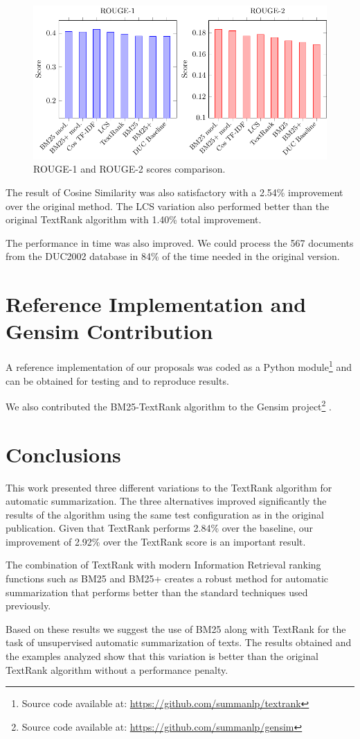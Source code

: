 \documentclass{llncs}
\begin{document}
\begin{figure}[h!]
    \centering
    \includegraphics[width=1\textwidth]{rouge-scores-en.pdf}
    \caption{ROUGE-1 and ROUGE-2 scores comparison.}
\end{figure}

The result of Cosine Similarity was also satisfactory with a 2.54\% improvement over the original method. The LCS variation also performed better than the original TextRank algorithm with 1.40\% total improvement.

The performance in time was also improved. We could process the 567 documents from the DUC2002 database in 84\% of the time needed in the original version.

\section{Reference Implementation and Gensim Contribution}
A reference implementation of our proposals was coded as a Python module\footnote{Source code available at: \url{https://github.com/summanlp/textrank}} and can be obtained for testing and to reproduce results.

We also contributed the BM25-TextRank algorithm to the Gensim project\footnote{Source code available at: \url{https://github.com/summanlp/gensim}} \cite{rehurek_lrec}.

\section{Conclusions}
This work presented three different variations to the TextRank algorithm for automatic summarization. The three alternatives improved significantly the results of the algorithm using the same test configuration as in the original publication. Given that TextRank performs 2.84\% over the baseline, our improvement of 2.92\% over the TextRank score is an important result. 

The combination of TextRank with modern Information Retrieval ranking functions such as BM25 and BM25+ creates a robust method for automatic summarization that performs better than the standard techniques used previously. 

Based on these results we suggest the use of BM25 along with TextRank for the task of unsupervised automatic summarization of texts. The results obtained and the examples analyzed show that this variation is better than the original TextRank algorithm without a performance penalty.

{}

\end{document}
